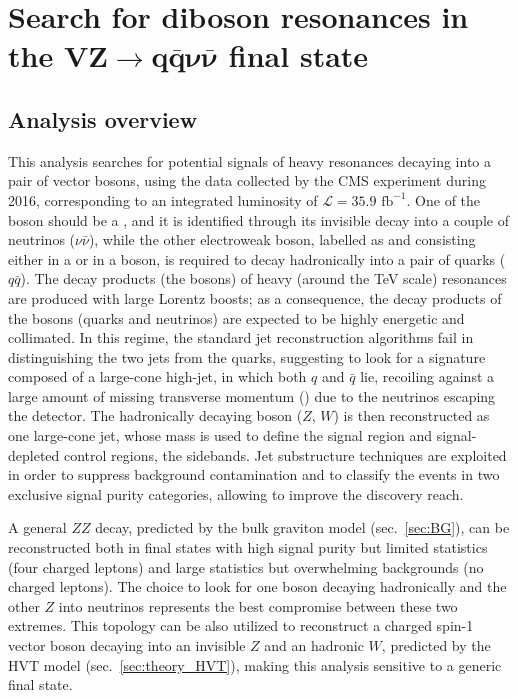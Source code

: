 \chapter{Search for diboson resonances in the $\mathbf{VZ \rightarrow  q \bar{q} \nu \bar{\nu}}$ final state}
\section{Analysis overview}

This analysis searches for potential signals of heavy resonances decaying into a pair of vector bosons, using the data collected by the CMS experiment during 2016, corresponding to an integrated luminosity of $\mathcal{L}=35.9 \mbox{ fb}^{-1}$. One of the boson should be a \Z, and it is identified through its invisible decay into a couple of neutrinos ($\nu \bar{\nu}$), while the other electroweak boson, labelled as \V and consisting either in a \W or in a \Z boson, is required to decay hadronically into a pair of quarks ($q \bar{q}$). %
The decay products (the bosons) of heavy (around the TeV scale) resonances are produced with large Lorentz boosts; as a consequence, the decay products of the bosons (quarks and neutrinos) are expected to be highly energetic and collimated. In this regime, the standard jet reconstruction algorithms fail in distinguishing the two jets from the quarks, suggesting to look for a signature composed of a large-cone high-\pt jet, in which both $q$ and $\bar{q}$ lie, recoiling against a large amount of missing transverse momentum (\met) due to the neutrinos escaping the detector. The hadronically decaying boson ($Z$, $W$) is then reconstructed as one large-cone jet, whose mass is used to define the signal region and signal-depleted control regions, the sidebands. Jet substructure techniques are exploited in order to suppress background contamination and to classify the events in two exclusive signal purity categories, allowing to improve the discovery reach.

\noindent A general $ZZ$ decay, predicted by the bulk graviton model (sec.~\ref{sec:BG}), can be reconstructed both in final states with high signal purity but limited statistics (four charged leptons) and large statistics but overwhelming backgrounds (no charged leptons). The choice to look for one boson decaying hadronically and the other $Z$ into neutrinos represents the best compromise between these two extremes. This topology can be also utilized to reconstruct a charged spin-1 vector boson \Wp decaying into an invisible $Z$ and an hadronic $W$, predicted by the HVT model (sec.~\ref{sec:theory_HVT}), making this analysis sensitive to a generic \VZ final state.

